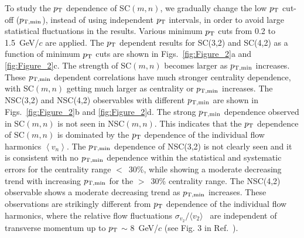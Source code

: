 To study the $p_{\rm T}$ dependence of SC$(m,n)$, we gradually change the low $p_{\rm T}$ cut-off ($p_{\rm T, min}$), instead of using independent $p_{\rm T}$ intervals, in order to avoid large statistical fluctuations in the results. Various minimum $p_{\rm T}$ cuts from 0.2 to 1.5~GeV/$c$ are applied.
The $p_{\rm T}$ dependent results for SC(3,2) and SC(4,2) as a function of minimum $p_{\rm T}$ cuts are shown in Figs.~\ref{fig:Figure_2}a and \ref{fig:Figure_2}c.
The strength of SC$(m,n)$ becomes larger as $p_{\rm T, min}$ increases. 
These $p_{\rm T, min}$ dependent correlations have much stronger centrality dependence, with SC$(m,n)$ getting much larger as centrality or $p_{\rm T, min}$ increases. 
The NSC(3,2) and NSC(4,2) observables with different $p_{\rm T, min}$ are shown in Figs.~\ref{fig:Figure_2}b and \ref{fig:Figure_2}d.
The strong $p_{\rm T, min}$ dependence observed in SC$(m,n)$ is not seen in NSC$(m,n)$. 
This indicates that the $p_{\rm T}$ dependence of SC$(m,n)$ is dominated by the $p_{\rm T}$  dependence of the individual flow harmonics $\left<v_n\right>$. 
The $p_{\rm T, min}$ dependence of NSC(3,2) is not clearly seen and it is consistent with no $p_{\rm T, min}$ dependence within the statistical and systematic errors for the centrality range $<$~30\%, while showing a moderate decreasing trend with increasing $p_{\rm T, min}$ for the $>$~30\% centrality range.
The NSC(4,2) observable shows a moderate decreasing trend as $p_{\rm T, min}$ increases. These observations are strikingly different from $p_{\rm T}$ dependence of the individual flow harmonics, where the relative flow fluctuations $\sigma_{v_2}/\langle v_{2} \rangle$~\cite{Voloshin:2008dg} are independent of transverse momentum up to $p_{\rm T}$ $\sim$ 8~GeV/$c$ (see Fig. 3 in Ref.~\cite{Abelev:2012di}).

